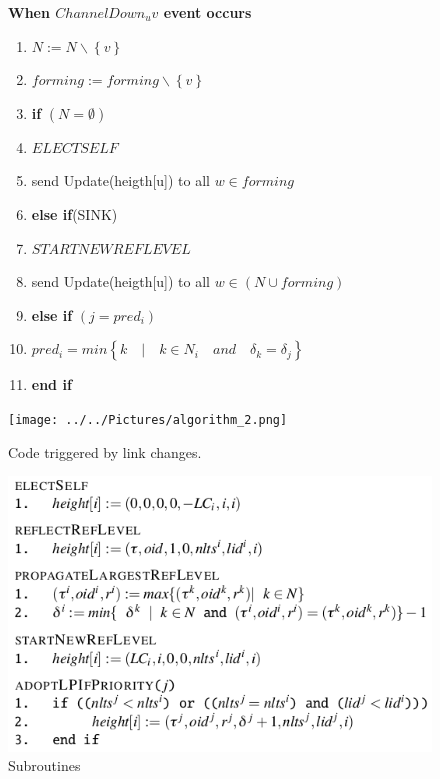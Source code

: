 \begin{figure}[hbtp]
\textbf{When $ChannelDown_uv$ event occurs}

\begin{enumerate}
\item \quad $ N := N\backslash \left\lbrace v\right\rbrace $
\item \quad $ forming := forming \backslash \left\lbrace v\right\rbrace $
\item \quad \textbf{if} $ (N = \emptyset )$
\item \quad \quad $ELECTSELF$
\item \quad \quad send Update(heigth[u]) to all $ w\in forming$
\item \quad \textbf{else if}(SINK)
\item \quad \quad $STARTNEWREFLEVEL$
\item \quad \quad send Update(heigth[u]) to all $w\in (N \cup forming)$
\item \quad \textbf{else if} $(j=pred_i)$
\item \quad \quad $pred_i=min \left\lbrace k \quad \vert \quad k\in N_i \quad and \quad \delta_k = \delta_j \right\rbrace$
\item \quad \textbf{end if}

\end{enumerate}
\end{figure}

\begin{figure}[hbtp]
\centering
\texttt{[image: ../../Pictures/algorithm\_2.png]}
\caption{Code triggered by link changes.}
\end{figure}
\begin{figure}[hbtp]
\centering
\includegraphics[scale=.75]{screenshot_3.png}
\caption{Subroutines}
\end{figure}

